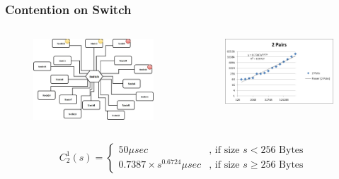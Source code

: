 \documentclass{beamer}
\begin{document}
\begin{frame}
\frametitle{Contention on Switch}
\begin{columns}[c]

\begin{figure}
\includegraphics[width=\linewidth,height=\textheight,keepaspectratio]{congestion2.jpg}
\end{figure}

\begin{figure}
\includegraphics[width=\linewidth,height=\textheight,keepaspectratio]{picture5.jpg}
\end{figure}

\end{columns}

\begin{block}{}
\begin{equation*}
C_2 ^1(s)=\begin{cases}
50 \mu sec & \text{, if size }s < 256 \text{ Bytes} \\
0.7387\times s^{0.6724} \mu sec & \text{, if size } s \geq 256 \text{ Bytes}
\end{cases}
\end{equation*}
\end{block}

\end{frame}
\end{document}
